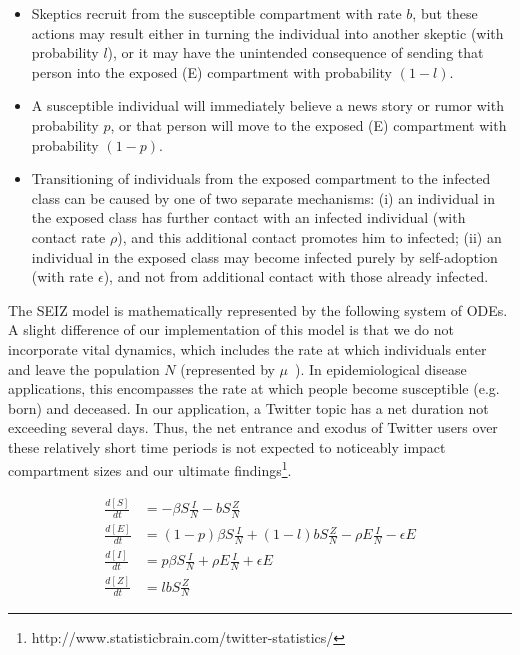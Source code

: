 \begin{itemize}
\item Skeptics recruit from the susceptible compartment with rate $b$, but these actions may result either in turning the individual into another skeptic
(with probability $l$), or it may have the unintended consequence of sending that person into the exposed (E) compartment with probability $(1 - l)$.
\item A susceptible individual will immediately believe a news story or rumor with probability $p$, or that person will move to the exposed (E) compartment with probability $(1 - p)$.
\item Transitioning of individuals from the exposed compartment to the infected class can be caused by one of two separate mechanisms: (i) an individual in the exposed class has further contact with an infected individual (with contact rate $\rho$), and this additional contact promotes him to infected; (ii) an individual in the exposed class may become infected purely by self-adoption (with rate $\epsilon$), and not from additional contact with those already infected. \end{itemize}


The SEIZ model is mathematically represented by the following system of ODEs. A slight difference of our implementation of this model is that we do not incorporate vital dynamics, which includes the rate at which individuals enter and leave the population $N$ (represented by $\mu$~\cite{powerofgoodidea:2006}). In epidemiological disease applications, this encompasses the rate at which people become susceptible (e.g. born) and deceased. In our application, a Twitter topic has a net duration not exceeding several days. Thus, the net entrance and exodus of Twitter users over these relatively short time periods is not expected to noticeably impact compartment sizes and our ultimate findings\footnote{http://www.statisticbrain.com/twitter-statistics/}.

\begin{subequations}\label{eq:seiz}
\begin{align}
\frac{d [S]}{dt} &= -\beta S \frac{I}{N} - bS \frac{Z}{N} \\
\frac{d [E]}{dt} &= (1-p)\beta S\frac{I}{N} + (1-l)bS\frac{Z}{N}-\rho E\frac{I}{N} -\epsilon E \\
\frac{d [I]}{dt} &= p\beta S \frac{I}{N} + \rho E \frac{I}{N} + \epsilon E \\
\frac{d [Z]}{dt} &= lbS \frac{Z}{N}
\end{align}
\end{subequations}


